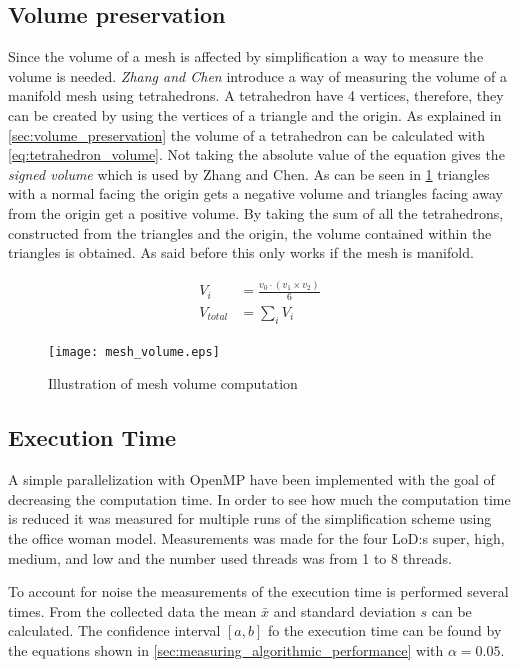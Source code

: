 \subsection{Volume preservation} \label{sec:computing_volume}
Since the volume of a mesh is affected by simplification a way to measure the volume is needed. \emph{Zhang and Chen} \cite{zhang2001efficient} introduce a way of measuring the volume of a manifold mesh using tetrahedrons. A tetrahedron have 4 vertices, therefore, they can be created by using the vertices of a triangle and the origin. As explained in \cref{sec:volume_preservation} the volume of a tetrahedron can be calculated with \cref{eq:tetrahedron_volume}. Not taking the absolute value of the equation gives the \emph{signed volume} which is used by Zhang and Chen. As can be seen in \cref{fig:mesh_volume} triangles with a normal facing the origin gets a negative volume and triangles facing away from the origin get a positive volume. By taking the sum of all the tetrahedrons, constructed from the triangles and the origin, the volume contained within the triangles is obtained. As said before this only works if the mesh is manifold.

\begin{align}
  V_i &= \frac{v_0 \cdot (v_1 \times v_2)}{6}\\
  V_{total} &= \sum_i{V_i}
\end{align}

\begin{figure}[h]
  \centering
  \texttt{[image: mesh\_volume.eps]}
  \caption{Illustration of mesh volume computation}
  \label{fig:mesh_volume}
  \end{figure}


\subsection{Execution Time} \label{sec:computation_time}
A simple parallelization with OpenMP have been implemented with the goal of decreasing the computation time. In order to see how much the computation time is reduced it was measured for multiple runs of the simplification scheme using the office woman model. Measurements was made for the four LoD:s super, high, medium, and low and the number used threads was from 1 to 8 threads.

To account for noise the measurements of the execution time is performed several times. From the collected data the mean \(\bar{x}\) and standard deviation \(s\) can be calculated. The confidence interval \([a, b]\) fo the execution time can be found by the equations shown in \cref{sec:measuring_algorithmic_performance} with \(\alpha = 0.05\).


